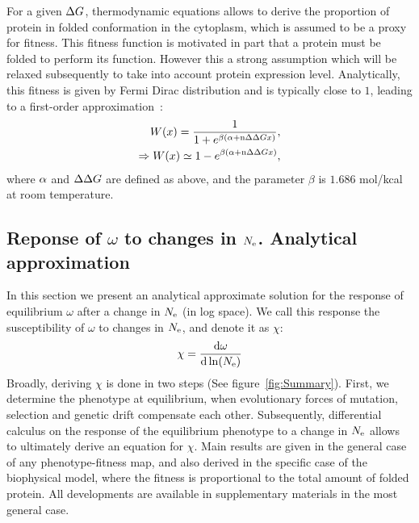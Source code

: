 For a given $\Delta G$, thermodynamic equations allows to derive the proportion of protein in folded conformation in the cytoplasm, which is assumed to be a proxy for fitness.
This fitness function is motivated in part that a protein must be folded to perform its function.
However this a strong assumption which will be relaxed subsequently to take into account protein expression level.
Analytically, this fitness is given by Fermi Dirac distribution and is typically close to $1$, leading to a first-order approximation~\citep{Goldstein2011}:
\begin{align}
    W (x) = \dfrac{1}{1 + e^{\beta (\alpha + \text{n} \Delta \Delta G x)}},\\
    \Rightarrow W (x) \simeq 1 - e^{\beta (\alpha + \text{n} \Delta \Delta G x)},
\end{align}
where $\alpha$ and $\Delta \Delta G$ are defined as above, and the parameter $\beta$ is $1.686$ mol/kcal at room temperature.

\subsection{Reponse of \texorpdfstring{$\omega$}{ω} to changes in \texorpdfstring{$N_{\mathrm{e}}$}{Nₑ}. Analytical approximation}

In this section we present an analytical approximate solution for the response of equilibrium $\omega$ after a change in $N_{\mathrm{e}}$ (in log space).
We call this response the susceptibility of $\omega$ to changes in $N_{\mathrm{e}}$, and denote it as $\chi$:
\begin{align}
    \chi = \frac{ \der \omega}{\der \ln (\Ne)} \label{eq:chi}
\end{align}
Broadly, deriving $\chi$ is done in two steps (See figure~\ref{fig:Summary}).
First, we determine the phenotype at equilibrium, when evolutionary forces of mutation, selection and genetic drift compensate each other.
Subsequently, differential calculus on the response of the equilibrium phenotype to a change in $N_{\mathrm{e}}$ allows to ultimately derive an equation for $\chi$.
Main results are given in the general case of any phenotype-fitness map, and also derived in the specific case of the biophysical model, where the fitness is proportional to the total amount of folded protein.
All developments are available in supplementary materials in the most general case.

